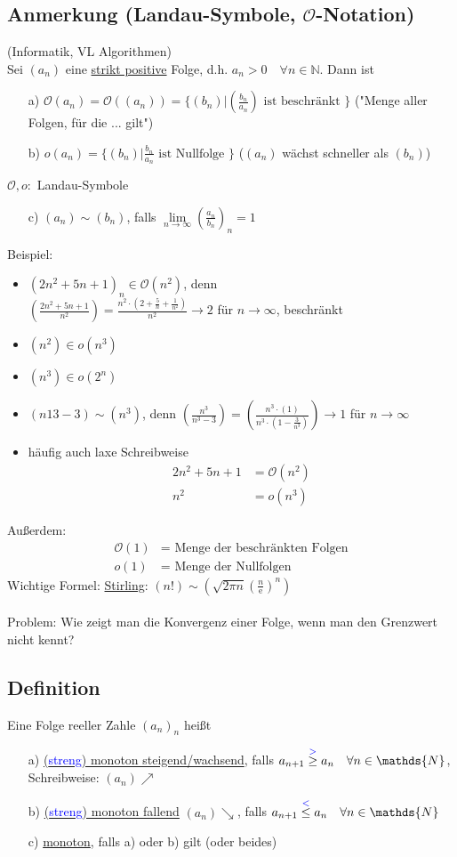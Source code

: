 \documentclass[12pt, titlepage]{article}
\newcommand{\N}{\mathds{N}}
\newcommand{\e}{\textrm{e}}
\newcommand{\infn}{n\rightarrow\infty}
\newcommand{\bmark}[1]{\textcolor{blue}{#1}}
\renewcommand{\>}{\rightarrow}
\renewcommand{\*}{\cdot}
\begin{document}
	\subsection{Anmerkung (Landau-Symbole, $\mathcal{O}$-Notation)}
	(Informatik, VL Algorithmen)\\
	Sei $(a_n)$ eine \underline{strikt positive} Folge, d.h. $a_n>0\quad\forall n\in\N$. Dann ist
	\begin{itemize}
		\item[a)] $\mathcal{O}(a_n)=\mathcal{O}((a_n))=\{(b_n)|(\frac{b_n}{a_n})\textrm{ ist beschränkt }\}$ ("Menge aller Folgen, für die ... gilt")
		\item[b)] $o(a_n)=\{(b_n)|\frac{b_n}{a_n}\textrm{ ist Nullfolge }\}$ ($(a_n)$ wächst schneller als $(b_n)$)
	\end{itemize}
	$\mathcal{O},o\colon $ Landau-Symbole
	\begin{itemize}
		\item[c)] $(a_n)\sim(b_n)$, falls $\lim\limits_{\infn}(\frac{a_n}{b_n})_n=1$
	\end{itemize}
	Beispiel:
	\begin{itemize}
		\item $(2n^2+5n+1)_n\in\mathcal{O}(n^2)$, denn\\
		$(\frac{2n^2+5n+1}{n^2})=\frac{n^2\*(2+\frac{5}{n}+\frac{1}{n^2})}{n^2}\>2$ für $\infn$, beschränkt
		\item $(n^2)\in o(n^3)$
		\item $(n^3)\in o(2^n)$
		\item $(n13-3)\sim(n^3)$, denn $(\frac{n^3}{n^3-3})=(\frac{n^3\*(1)}{n^3\*(1-\frac{3}{n^3})})\>1$ für $\infn$
		\item häufig auch laxe Schreibweise
		\begin{align*}
			2n^2+5n+1&=\mathcal{O}(n^2)\\
			n^2&=o(n^3)
		\end{align*}
	\end{itemize}
	Außerdem:
	\begin{align*}
		\mathcal{O}(1)&=\textrm{ Menge der beschränkten Folgen}\\
		o(1)&=\textrm{ Menge der Nullfolgen}
	\end{align*}
	Wichtige Formel: \underline{Stirling}: $(n!)\sim(\sqrt{2\pi n}(\frac{n}{\e})^n)$\\
	\\
	Problem: Wie zeigt man die Konvergenz einer Folge, wenn man den Grenzwert nicht kennt?
	\subsection{Definition}
	Eine Folge reeller Zahle $(a_n)_n$ heißt
	\begin{itemize}
		\item[a)] \underline{(\bmark{streng}) monoton steigend/wachsend}, falls $a_{n+1}\overset{\bmark{>}}{\geq}a_n\quad\forall n\in\N$, Schreibweise: $(a_n)\nearrow$
		\item[b)] \underline{(\bmark{streng}) monoton fallend} $(a_n)\searrow$, falls $a_{n+1}\overset{\bmark{<}}{\leq}a_n\quad\forall n\in\N$
		\item[c)] \underline{monoton}, falls a) oder b) gilt (oder beides)
	\end{itemize}	
\end{document}
